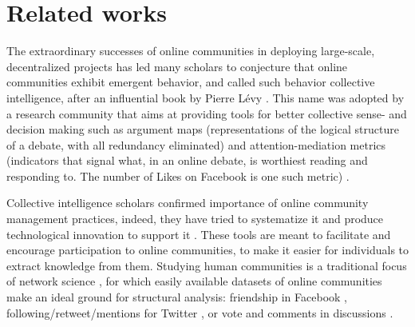 \documentclass{bmcart}
\begin{document}

\section*{Related works}
\label{sec:related_works}
The extraordinary successes of online communities in deploying large-scale, decentralized projects has led many scholars to conjecture that online communities exhibit emergent behavior, and called such behavior collective intelligence, after an influential book by Pierre L\'evy \cite{pierre1997collective}. This name was adopted by a research community that aims at providing tools for better collective sense- and decision making such as argument maps (representations of the logical structure of a debate, with all redundancy eliminated) \cite{shum2003roots} and attention-mediation metrics (indicators that signal what, in an online debate, is worthiest reading and responding to. The number of Likes on Facebook is one such metric) \cite{klein2012enabling}. 

Collective intelligence scholars confirmed importance of online community management practices, indeed, they have tried to systematize it \cite{diplaris2011emerging} and produce technological innovation to support it \cite{shum2003roots} \cite{de2012contested}. 
These tools are meant to facilitate and encourage participation to online communities, to make it easier for individuals to extract knowledge from them.
Studying human communities is a traditional focus of network science \cite{borgatti2009network} \cite{burt2009structural}, for which  easily available datasets of online communities make an ideal ground for structural analysis: friendship in Facebook \cite{lewis2008tastes}\cite{nick2013toward}, following/retweet/mentions for Twitter \cite{kunegis2013preferential} \cite{java2007we} \cite{hodas2014simple}, or vote and comments in discussions \cite{hodas2014simple} \cite{laniado2011wikipedians} \cite{zhang2007expertise} \cite{zanetti2012quantitative}. 
\end{document}
